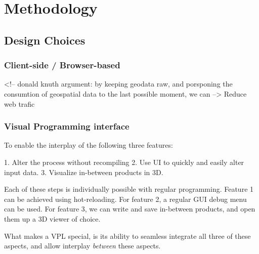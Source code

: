 \chapter{Methodology}


\section{Design Choices}

\subsection{Client-side / Browser-based}


<!-- donald knuth argument: by keeping geodata raw, and porsponing the consumtion of geospatial data to the last possible moment, we can  -->
Reduce web trafic

\subsection{Visual Programming interface}



To enable the interplay of the following three features: 

1. Alter the process without recompiling
2. Use UI to quickly and easily alter input data.
3. Visualize in-between products in 3D. 

Each of these steps is individually possible with regular programming. Feature 1 can be achieved using hot-reloading. For feature 2, a regular GUI debug menu can be used. For feature 3, we can write and save in-between products, and open them up a 3D viewer of choice. 

What makes a VPL special, is its ability to seamless integrate all three of these aspects, and allow interplay \emph{between} these aspects.

